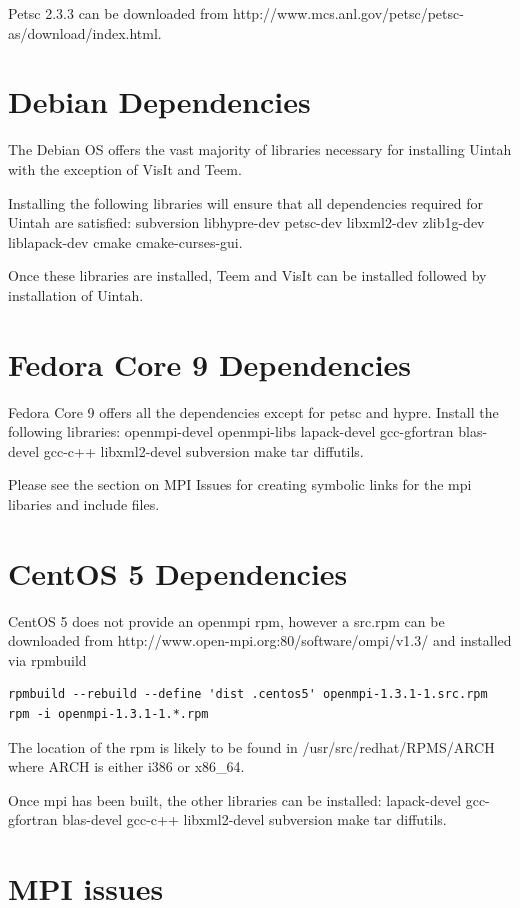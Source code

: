\documentclass[12pt]{report}
\begin{document}
Petsc 2.3.3 can be downloaded from
http://www.mcs.anl.gov/petsc/petsc-as/download/index.html.

\section{Debian Dependencies}

The Debian OS offers the vast majority of libraries necessary for
installing Uintah with the exception of VisIt and Teem.

Installing the following libraries will ensure that all dependencies
required for Uintah are satisfied: subversion libhypre-dev petsc-dev
libxml2-dev zlib1g-dev liblapack-dev cmake cmake-curses-gui.

Once these libraries are installed, Teem and VisIt can be installed
followed by installation of Uintah.

\section{Fedora Core 9 Dependencies}

Fedora Core 9 offers all the dependencies except for petsc and hypre.
Install the following libraries: openmpi-devel openmpi-libs
lapack-devel gcc-gfortran blas-devel gcc-c++ libxml2-devel subversion
make tar diffutils.  

Please see the section on MPI Issues for creating symbolic links for
the mpi libaries and include files.

\section{CentOS 5 Dependencies}

CentOS 5 does not provide an openmpi rpm, however a src.rpm can be
downloaded from http://www.open-mpi.org:80/software/ompi/v1.3/ and
installed via rpmbuild

\begin{Verbatim}
rpmbuild --rebuild --define 'dist .centos5' openmpi-1.3.1-1.src.rpm
rpm -i openmpi-1.3.1-1.*.rpm
\end{Verbatim}

The location of the rpm is likely to be found in
/usr/src/redhat/RPMS/ARCH where ARCH is either i386 or x86\_64.

Once mpi has been built, the other libraries can be installed:
lapack-devel gcc-gfortran blas-devel gcc-c++ libxml2-devel subversion
make tar diffutils.

\section{MPI issues}
\end{document}
